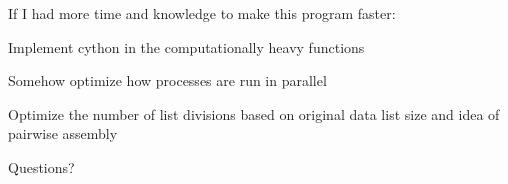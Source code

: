 \documentclass{beamer}
\begin{document}
\begin{frame}
If I had more time and knowledge to make this program faster:

\textbullet Implement cython in the computationally heavy functions

\textbullet Somehow optimize how processes are run in parallel

\textbullet Optimize the number of list divisions based on original data list size and idea of pairwise assembly
\end{frame}


\begin{frame}
Questions?
\end{frame}
\end{document}
